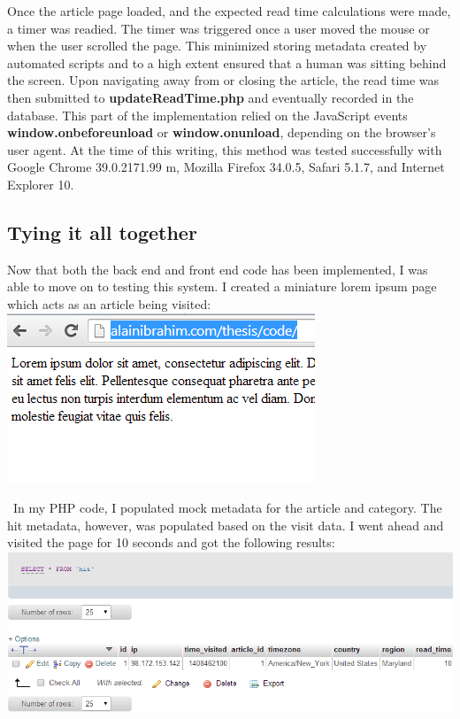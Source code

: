 \documentclass[12pt]{article}
\begin{document}
Once the article page loaded, and the expected read time calculations were made, a timer was readied. The timer was triggered once a user moved the mouse or when the user scrolled the page. This minimized storing metadata created by automated scripts and to a high extent ensured that a human was sitting behind the screen. Upon navigating away from or closing the article, the read time was then submitted to \textbf{updateReadTime.php} and eventually recorded in the database. This part of the implementation relied on the JavaScript events \textbf{window.onbeforeunload} or \textbf{window.onunload}, depending on the browser's user agent. At the time of this writing, this method was tested successfully with Google Chrome 39.0.2171.99 m, Mozilla Firefox 34.0.5, Safari 5.1.7, and Internet Explorer 10.
 
\vfill

\subsection{Tying it all together}
Now that both the back end and front end code has been implemented, I was able to move on to testing this system. I created a miniature lorem ipsum page which acts as an article being visited: \\

\noindent\includegraphics[scale=1]{img/visit1}

\noindent\ In my PHP code, I populated mock metadata for the article and category. The hit metadata, however, was populated based on the visit data. I went ahead and visited the page for 10 seconds and got the following results:\\

\noindent\includegraphics[scale=0.6]{img/visit2}
\end{document}

